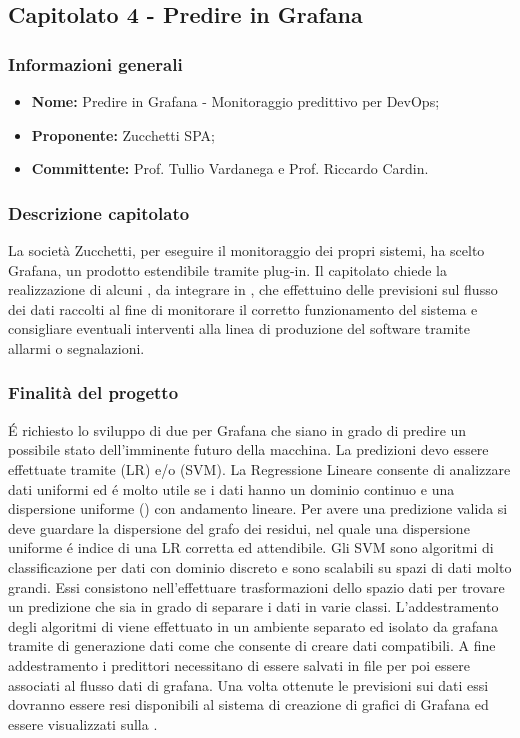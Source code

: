 
\subsection{Capitolato 4 - Predire in Grafana}

		\subsubsection{Informazioni generali}
			\begin{itemize} %
			  \item \textbf{Nome:} Predire in Grafana - Monitoraggio predittivo per DevOps;
			  \item \textbf{Proponente:} Zucchetti SPA;
				\item \textbf{Committente: }Prof. Tullio Vardanega e Prof. Riccardo Cardin.
			\end{itemize}

		\subsubsection{Descrizione capitolato}
			La società Zucchetti, per eseguire il monitoraggio dei propri sistemi, ha scelto Grafana, un prodotto  estendibile tramite plug-in.
			Il capitolato chiede la realizzazione di alcuni , da integrare in , che effettuino delle previsioni sul flusso dei dati raccolti al fine di monitorare il corretto funzionamento del sistema e consigliare eventuali interventi alla linea di produzione del software tramite allarmi o segnalazioni.

		\subsubsection{Finalità del progetto}
			É richiesto lo sviluppo di due  per Grafana che siano in grado di predire un possibile stato dell'imminente futuro della macchina. La predizioni devo essere effettuate tramite  (LR) e/o  (SVM).
			La Regressione Lineare consente di analizzare dati uniformi ed é molto utile se i dati hanno un dominio continuo e una dispersione uniforme () con andamento lineare. Per avere una predizione valida si deve guardare la dispersione del grafo dei residui, nel quale una dispersione uniforme é indice di una LR corretta ed attendibile.
			Gli SVM sono algoritmi di classificazione per dati con dominio discreto e sono scalabili su spazi di dati molto grandi. Essi consistono nell'effettuare trasformazioni dello spazio dati per trovare un predizione che sia in grado di separare i dati in varie classi.
			L'addestramento degli algoritmi di  viene effettuato in un ambiente separato ed isolato da grafana tramite  di generazione dati come  che consente di creare dati compatibili. A fine addestramento i predittori necessitano di essere salvati in file  per poi essere associati al flusso dati di grafana. Una volta ottenute le previsioni sui dati essi dovranno essere resi disponibili al sistema di creazione di grafici di Grafana ed essere visualizzati sulla .

